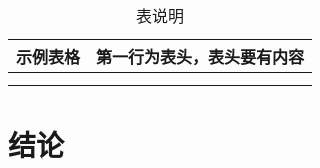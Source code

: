 \documentclass{cjc}
\begin{document}
\begin{table}[htb]
  \centering
  \caption{表说明}
  \small
  \begin{tabular}{cc}
    \toprule
    示例表格 & 第一行为表头，表头要有内容 \\
    \midrule
    & \\
    \midrule
    & \\
    \bottomrule
  \end{tabular}
\end{table}








% 
% 



\section{结论}


\end{document}
